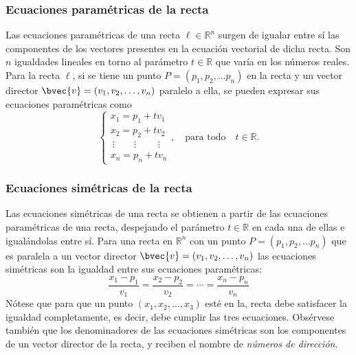 \documentclass{fmbnotes}
\begin{document}
\subsubsection{Ecuaciones paramétricas de la recta}
Las ecuaciones paramétricas de una recta \( \ell \in \mathbb{R}^{n} \) surgen de igualar entre sí las componentes de los vectores presentes en la ecuación vectorial de dicha recta. Son \( n \) igualdades lineales en torno al parámetro \( t \in \mathbb{R} \) que varía en los números reales. Para la recta \( \ell\), si se tiene un punto \( P=\left(p_{1}, p_{2}, \ldots p_{n}\right) \) en la recta y un vector director \( \bvec{v}=\left(v_{1}, v_{2}, \ldots, v_{n}\right) \) paralelo a ella, se pueden expresar sus ecuaciones paramétricas como
\[ \begin{cases}
x_{1}=p_{1}+t v_{1} \\
x_{2}=p_{2}+t v_{2}\\
\: \vdots \qquad \vdots \qquad \; \vdots \\
x_{n}=p_{n}+t v_{n}
\end{cases}, \quad \text{para todo} \quad t \in \mathbb{R}. \]

\subsubsection{Ecuaciones simétricas de la recta}
Las ecuaciones simétricas de una recta se obtienen a partir de las ecuaciones paramétricas de una recta, despejando el parámetro \( t \in \mathbb{R} \) en cada una de ellas e igualándolas entre sí. Para una recta en \( \mathbb{R}^{n} \) con un punto \( P=\left(p_{1}, p_{2}, \ldots p_{n}\right) \) que es paralela a un vector director \( \bvec{v}=\left(v_{1}, v_{2}, \ldots, v_{n}\right) \) las ecuaciones simétricas son la igualdad entre sus ecuaciones paramétricas:
\[\frac{x_{1}-p_{1}}{v_{1}}=\frac{x_{2}-p_{2}}{v_{2}}=\cdots=\frac{x_{n}-p_{n}}{v_{n}}\]
Nótese que para que un punto \( (x_1,x_2,\ldots,x_3) \) esté en la, recta debe satisfacer la igualdad completamente, es decir, debe cumplir las tres ecuaciones. Obsérvese también que los denominadores de las ecuaciones simétricas son los componentes de un vector director de la recta, y reciben el nombre de \emph{números de dirección}.
\end{document}
